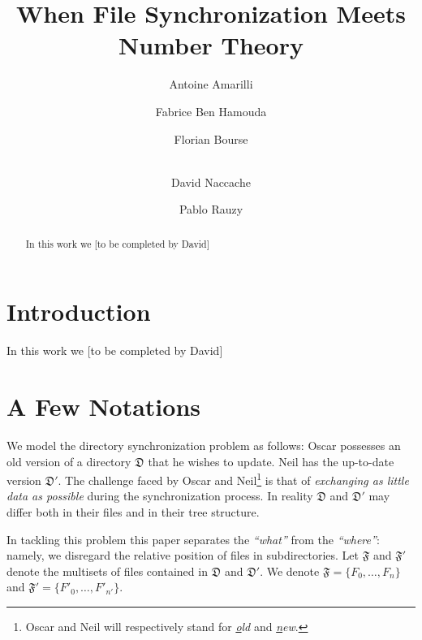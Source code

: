 \documentclass[11pt]{llncs}
\begin{document}
\title{When File Synchronization Meets Number Theory}

\author{Antoine Amarilli \and Fabrice Ben Hamouda \and Florian Bourse \and\\
David Naccache \and Pablo Rauzy}


\maketitle

\begin{abstract}

In this work we [to be completed by David]

\end{abstract}

\section{Introduction}

In this work we [to be completed by David]

\section{A Few Notations}

We model the directory synchronization problem as follows: Oscar possesses an old version of a directory $\mathfrak{D}$ that he wishes to update. Neil has the up-to-date version $\mathfrak{D}'$. The challenge faced by Oscar and Neil\footnote{Oscar and Neil will respectively stand for {\sl \underline{o}ld} and {\sl \underline{n}ew}.} is that of {\sl exchanging as little data as possible} during the synchronization process. In reality $\mathfrak{D}$ and $\mathfrak{D}'$ may differ both in their files and in their tree structure.\smallskip

In tackling this problem this paper separates the {\sl ``what''} from the {\sl ``where''}: namely, we disregard the relative position of files in subdirectories. Let $\mathfrak{F}$ and $\mathfrak{F}'$ denote the multisets of files contained in $\mathfrak{D}$ and $\mathfrak{D}'$. We denote $\mathfrak{F}=\{F_0,\ldots,F_{n}\}$ and $\mathfrak{F}'=\{F'_0,\ldots,F'_{n'}\}$.\smallskip
\end{document}

